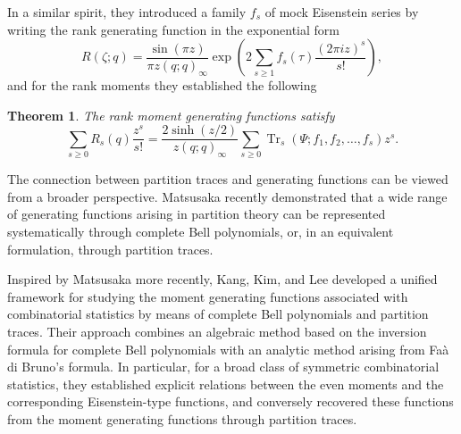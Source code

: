 \documentclass[12pt,oneside,reqno]{amsart}
\numberwithin{equation}{section}
\newtheorem{theorem}{Theorem}[section]
\begin{document}
In a similar spirit, they \cite{Bringmann2025} introduced a family $f_s$ of mock Eisenstein series by writing the rank generating function in the exponential form
\begin{equation}\label{eq1.17}
	R(\zeta;q)
	=
	\frac{\sin(\pi z)}{\pi z(q;q)_\infty}
	\exp\left(
	2\sum_{s\geq1}
	f_s(\tau)\frac{(2\pi iz)^s}{s!}
	\right),
\end{equation}
and for the rank moments they established the following 
\begin{theorem}\label{thm2}
	The rank moment generating functions satisfy
	\begin{equation}\label{eq1.18}
		\sum_{s\geq0}R_s(q)\frac{z^s}{s!}
		=
		\frac{2\sinh(z/2)}{z(q;q)_\infty}
		\sum_{s\geq0}
		\operatorname{Tr}_s
		(\Psi;f_1,f_2,\ldots,f_s)z^s.
	\end{equation}
\end{theorem}

The connection between partition traces and generating functions can
be viewed from a broader perspective. Matsusaka \cite{Matsusaka2025} recently
demonstrated that a wide range of generating functions arising in
partition theory can be represented systematically through complete
Bell polynomials, or, in an equivalent formulation, through partition
traces. 

Inspired by Matsusaka \cite{Matsusaka2025} more recently, Kang, Kim, and Lee \cite{Kang2026} developed a unified framework for studying the moment generating functions associated with combinatorial statistics by means of complete Bell polynomials and partition traces. Their approach combines an algebraic method based on the inversion formula for complete Bell polynomials with an analytic method arising from Faà di Bruno's formula. In particular, for a broad class of symmetric combinatorial statistics, they established explicit relations between the even moments and the corresponding Eisenstein-type functions, and conversely recovered these functions from the moment generating functions through partition traces.
 
\end{document}
